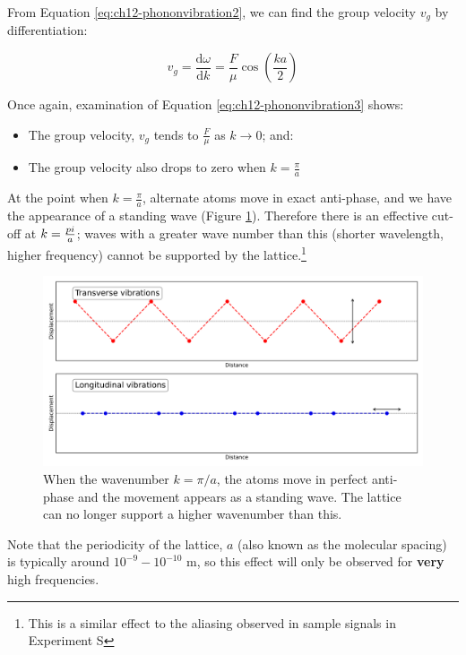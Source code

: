 \documentclass[
]{book}
\providecommand{\tightlist}{%
  \setlength{\itemsep}{0pt}\setlength{\parskip}{0pt}}
\begin{document}
From Equation \eqref{eq:ch12-phononvibration2}, we can find the group velocity \(v_g\) by differentiation:

\begin{equation}
v_g = \frac{\mathrm{d}\omega}{\mathrm{d}k} = \frac{F}{\mu} \cos \left(\frac{ka}{2}\right)
\label{eq:ch12-phononvibration3}
\end{equation}

Once again, examination of Equation \eqref{eq:ch12-phononvibration3} shows:

\begin{itemize}
\tightlist
\item
  The group velocity, \(v_g\) tends to \(\frac{F}{\mu}\) as \(k \rightarrow 0\); and:
\item
  The group velocity also drops to zero when \(k = \frac{\pi}{a}\)
\end{itemize}

At the point when \(k = \frac{\pi}{a}\), alternate atoms move in exact anti-phase, and we have the appearance of a standing wave (Figure \ref{fig:ch12-dispersionlattice1}). Therefore there is an effective cut-off at \(k = \frac{\\pi}{a}\); waves with a greater wave number than this (shorter wavelength, higher frequency) cannot be supported by the lattice.\footnote{This is a similar effect to the aliasing observed in sample signals in Experiment S}

\begin{figure}

{\centering \includegraphics[width=0.7\linewidth]{visualisations/ch12-phonons2} 

}

\caption{When the wavenumber $k = \pi / a$, the atoms move in perfect anti-phase and the movement appears as a standing wave. The lattice can no longer support a higher wavenumber than this.}\label{fig:ch12-dispersionlattice1}
\end{figure}

Note that the periodicity of the lattice, \(a\) (also known as the molecular spacing) is typically around \(10^{-9} - 10^{-10}\) m, so this effect will only be observed for \textbf{very} high frequencies.
\end{document}
